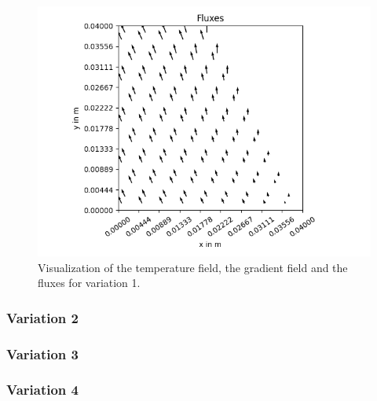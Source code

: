 \documentclass[a4paper,pt]{report}
\begin{document}
\begin{figure}
	\includegraphics[scale=0.3]{fluxesV1.png}
	\caption{Visualization of the temperature field, the gradient field and the fluxes for variation 1.}
	\label{plotsV1}
\end{figure}

\subsubsection*{Variation 2}
\subsubsection*{Variation 3}
\subsubsection*{Variation 4}
\end{document}

